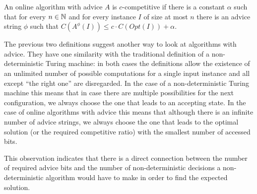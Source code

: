\begin{definition}\label{def:advice-competitive}
    An online algorithm with advice $A$ is $c$-competitive if there is a
    constant $\alpha$ such that for every $n \in \mathbb{N}$ and for every
    instance $I$ of size at most $n$ there is an advice string $\phi$ such
    that $C(A^\phi(I)) \leq c \cdot C(Opt(I)) + \alpha$.
\end{definition}

The previous two definitions suggest another way to look at algorithms
with advice. They have one similarity with the traditional definition of a
non-deterministic Turing machine: in both cases the definitions allow the
existence of an unlimited number of possible computations for a single
input instance and all except ``the right one'' are disregarded. In the
case of a non-deterministic Turing machine this means that in case there
are multiple possibilities for the next configuration, we always choose
the one that leads to an accepting state. In the case of online algorithms
with advice this means that although there is an infinite number of advice
strings, we always choose the one that leads to the optimal solution (or
the required competitive ratio) with the smallest number of accessed bits.

This observation indicates that there is a direct connection between the
number of required advice bits and the number of non-deterministic
decisions a non-deterministic algorithm would have to make in order to
find the expected solution.
